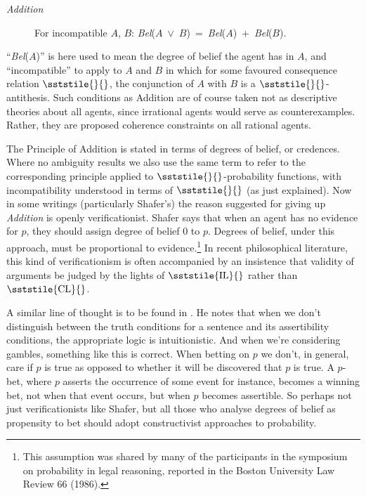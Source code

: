 \begin{description}
\item[\textit{Addition}] For incompatible \(A\), \(B\): \textit{Bel}(\(A\)~${\vee}$~\(B\))~=~\textit{Bel}(\(A\))~+~\textit{Bel}(\(B\)).
\end{description}

\noindent ``\textit{Bel}(\(A\))'' is here used to mean the degree of belief the agent has in \(A\), and ``incompatible'' to apply to \(A\) and \(B\) in which for some favoured consequence relation {\small \(\sststile{}{}\)}, the conjunction of \(A\) with \(B\) is a {\small \(\sststile{}{}\)}{}-antithesis. Such conditions as Addition are of course taken not as descriptive theories about all agents, since irrational agents would serve as counterexamples. Rather, they are proposed coherence constraints on all rational agents.

The Principle of Addition is stated in terms of degrees of belief, or credences. Where no ambiguity results we also use the same term to refer to the corresponding principle applied to {\small \(\sststile{}{}\)}{}-probability functions, with incompatibility understood in terms of {\small \(\sststile{}{}\)} (as just explained). Now in some writings (particularly Shafer's) the reason suggested for giving up \textit{Addition} is openly verificationist. Shafer says that when an agent has no evidence for \(p\), they should assign degree of belief 0 to \(p\). Degrees of belief, under this approach, must be proportional to evidence.\footnote{This assumption was shared by many of the participants in the symposium on probability in legal reasoning, reported in the Boston University Law Review 66 (1986).} In recent philosophical literature, this kind of verificationism is often accompanied by an insistence that validity of arguments be judged by the lights of {\small \(\sststile{\mathrm{IL}}{}\)} rather than {\small \(\sststile{\mathrm{CL}}{}\)}.

A similar line of thought is to be found in \citet{Harman1983}. He notes that when we don't distinguish between the truth conditions for a sentence and its assertibility conditions, the appropriate logic is intuitionistic. And when we're considering gambles, something like this is correct. When betting on \(p\) we don't, in general, care if \(p\) is true as opposed to whether it will be discovered that \(p\) is true. A \(p\)\nobreakdash-bet, where \(p\) asserts the occurrence of some event for instance, becomes a winning bet, not when that event occurs, but when \(p\) becomes assertible. So perhaps not just verificationists like Shafer, but all those who analyse degrees of belief as propensity to bet should adopt constructivist approaches to probability.

